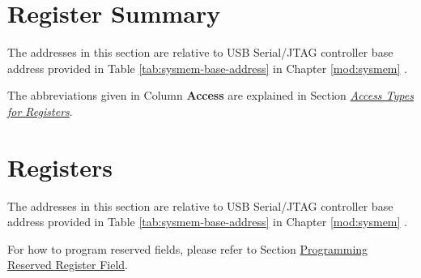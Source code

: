 \documentclass[main\_\_EN.tex]{subfiles}
\begin{document}



\newpage
\hypertarget{usbserialjtag-reg-summ}{}
\section{Register Summary}
\label{sec:usbserialjtag-reg-summ}

The addresses in this section are relative to USB Serial/JTAG controller base address provided in Table \ref{tab:sysmem-base-address} in Chapter \ref{mod:sysmem} \textit{}.

The abbreviations given in Column \textbf{Access} are explained in Section \hyperref[glossary-access-types]{\textit{Access Types for Registers}}.






\newpage
\section{Registers}

The addresses in this section are relative to USB Serial/JTAG controller base address provided in Table \ref{tab:sysmem-base-address} in Chapter \ref{mod:sysmem} \textit{}.

For how to program reserved fields, please refer to Section \hyperref[programming-reserved-field]{Programming Reserved Register Field}.


\end{document}
